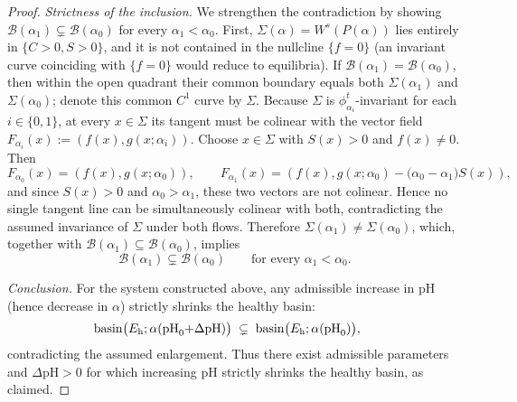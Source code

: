 \begin{proof}
\emph{Strictness of the inclusion.} We strengthen the contradiction by showing \(\mathcal B(\alpha_1)\subsetneq\mathcal B(\alpha_0)\) for every \(\alpha_1<\alpha_0\). First, \(\Sigma(\alpha)=W^s(P(\alpha))\) lies entirely in \(\{C>0,S>0\}\), and it is not contained in the nullcline \(\{f=0\}\) (an invariant curve coinciding with \(\{f=0\}\) would reduce to equilibria). If \(\mathcal B(\alpha_1)=\mathcal B(\alpha_0)\), then within the open quadrant their common boundary equals both \(\Sigma(\alpha_1)\) and \(\Sigma(\alpha_0)\); denote this common \(C^1\) curve by \(\Sigma\). Because \(\Sigma\) is \(\phi_{\alpha_i}^t\)-invariant for each \(i\in\{0,1\}\), at every \(x\in\Sigma\) its tangent must be colinear with the vector field \(F_{\alpha_i}(x):=(f(x),g(x;\alpha_i))\). Choose \(x\in\Sigma\) with \(S(x)>0\) and \(f(x)\neq 0\). Then
\[
F_{\alpha_0}(x)=(f(x),g(x;\alpha_0)),\qquad F_{\alpha_1}(x)=(f(x),g(x;\alpha_0)-\big(\alpha_0-\alpha_1\big)S(x)),
\]
and since \(S(x)>0\) and \(\alpha_0>\alpha_1\), these two vectors are not colinear. Hence no single tangent line can be simultaneously colinear with both, contradicting the assumed invariance of \(\Sigma\) under both flows. Therefore \(\Sigma(\alpha_1)\ne\Sigma(\alpha_0)\), which, together with \(\mathcal B(\alpha_1)\subseteq\mathcal B(\alpha_0)\), implies
\[
\mathcal B(\alpha_1)\subsetneq\mathcal B(\alpha_0)\qquad\text{for every }\alpha_1<\alpha_0.
\]

\emph{Conclusion.} For the system constructed above, any admissible increase in pH (hence decrease in \(\alpha\)) strictly shrinks the healthy basin:
\[
\mathrm{basin}\big(E_{\mathrm{h}};\alpha(\mathrm{pH}_0{+}\Delta\mathrm{pH})\big)\;\subsetneq\;\mathrm{basin}\big(E_{\mathrm{h}};\alpha(\mathrm{pH}_0)\big),\quad\qedhere
\]
contradicting the assumed enlargement. Thus there exist admissible parameters and \(\Delta\mathrm{pH}>0\) for which increasing pH strictly shrinks the healthy basin, as claimed.
\end{proof}
